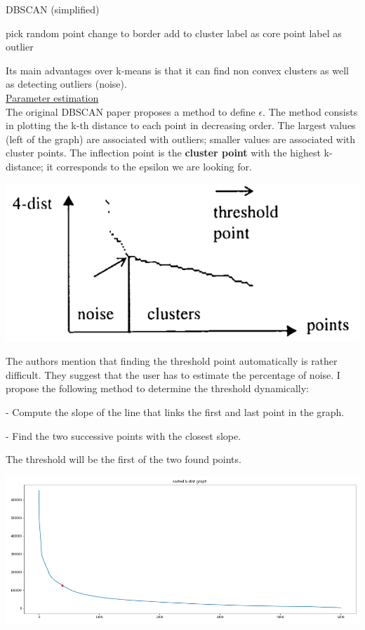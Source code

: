 \begin{algorithm}
\caption{DBSCAN (simplified)}
\begin{algorithmic}
\State pick random point
\State change to border
\EndIf 
\State add to cluster
\EndFor
\Else
{}
\State label as core point
\Else
\State label as outlier
\EndIf
\EndIf 
\EndWhile
\end{algorithmic}
\end{algorithm}

Its main advantages over k-means is that it can find non convex clusters as well as detecting outliers (noise). \\

\underline{Parameter estimation} \\

The original DBSCAN paper proposes a method to define $\epsilon$. The method consists in plotting the k-th distance to each point in decreasing order. The largest values (left of the graph) are associated with outliers; smaller values are associated with cluster points. The inflection point is the \textbf{cluster point} with the highest k-distance; it corresponds to the epsilon we are looking for.

\begin{center}
\includegraphics[scale=0.4]{DBSCAN_epsilon.png}
\end{center}

The authors mention that finding the threshold point automatically is rather difficult. They suggest that the user has to estimate the percentage of noise.
I propose the following method to determine the threshold dynamically:

- Compute the slope of the line that links the first and last point in the graph.

- Find the two successive points with the closest slope.

The threshold will be the first of the two found points.

\begin{center}
\includegraphics[scale=0.4]{DBSCAN_epsilon_2.png}
\end{center}

\vspace{5mm}